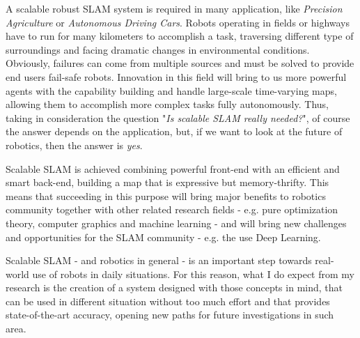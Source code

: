 \documentclass[10pt,a4paper, notitlepage]{report}
\begin{document}
A scalable robust SLAM system is required in many application, like \textit{Precision Agriculture} or \textit{Autonomous Driving Cars}. Robots operating in fields or highways have to run for many kilometers to accomplish a task, traversing different type of surroundings and facing dramatic changes in environmental conditions. Obviously, failures can come from multiple sources and must be solved to provide end users fail-safe robots. Innovation in this field will bring to us more powerful agents with the capability building and handle large-scale time-varying maps, allowing them to accomplish more complex tasks fully autonomously. Thus, taking in consideration the question "\textit{Is scalable SLAM really needed?}", of course the answer depends on the application, but, if we want to look at the future of robotics, then the answer is \textit{yes}.

Scalable SLAM is achieved combining powerful front-end with an efficient and smart back-end, building a map that is expressive but memory-thrifty. This means that succeeding in this purpose will bring major benefits to robotics community together with other related research fields - e.g. pure optimization theory, computer graphics and machine learning -  and will bring new challenges and opportunities for the SLAM community - e.g. the use Deep Learning. 

\vspace{10px}

Scalable SLAM - and robotics in general - is an important step towards real-world use of robots in daily situations. For this reason, what I do expect from my research is the creation of a system designed with those concepts in mind, that can be used in different situation without too much effort and that provides state-of-the-art accuracy, opening new paths for future investigations in such area.






\end{document}
